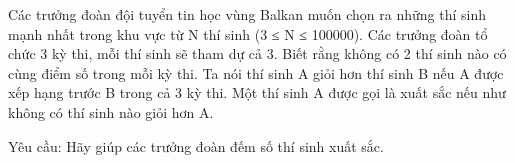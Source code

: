Các trưởng đoàn đội tuyển tin học vùng Balkan muốn chọn ra những thí sinh mạnh nhất trong khu vực từ N thí sinh (3 ≤ N ≤ 100000). Các trưởng   đoàn tổ chức 3 kỳ thi, mỗi thí sinh sẽ tham dự cả 3. Biết rằng không có 2 thí sinh nào có cùng điểm số trong mỗi kỳ thi. Ta nói thí sinh A       giỏi   hơn      thí sinh B nếu A được xếp hạng trước B trong cả 3 kỳ thi. Một thí sinh A được gọi là       xuất sắc      nếu như không có thí sinh nào giỏi hơn   A.  

   Yêu cầu: Hãy giúp các trưởng đoàn đếm số thí sinh xuất sắc.  

\